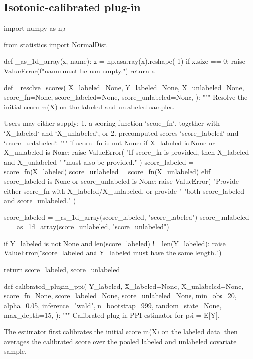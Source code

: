 \documentclass{article}
\theoremstyle{plain}
\theoremstyle{definition}
\newcommand{\1}{\mathbbm{1}}
\begin{document}
\subsection{Isotonic-calibrated plug-in}
\begin{codeblock}
import numpy as np

from statistics import NormalDist


def _as_1d_array(x, name):
    x = np.asarray(x).reshape(-1)
    if x.size == 0:
        raise ValueError(f"{name} must be non-empty.")
    return x


def _resolve_scores(
    X_labeled=None,
    Y_labeled=None,
    X_unlabeled=None,
    score_fn=None,
    score_labeled=None,
    score_unlabeled=None,
):
    """
    Resolve the initial score m(X) on the labeled and unlabeled samples.

    Users may either supply:
    1. a scoring function `score_fn`, together with `X_labeled` and
       `X_unlabeled`, or
    2. precomputed scores `score_labeled` and `score_unlabeled`.
    """
    if score_fn is not None:
        if X_labeled is None or X_unlabeled is None:
            raise ValueError(
                "If score_fn is provided, then X_labeled and X_unlabeled "
                "must also be provided."
            )
        score_labeled = score_fn(X_labeled)
        score_unlabeled = score_fn(X_unlabeled)
    elif score_labeled is None or score_unlabeled is None:
        raise ValueError(
            "Provide either score_fn with X_labeled/X_unlabeled, or provide "
            "both score_labeled and score_unlabeled."
        )

    score_labeled = _as_1d_array(score_labeled, "score_labeled")
    score_unlabeled = _as_1d_array(score_unlabeled, "score_unlabeled")

    if Y_labeled is not None and len(score_labeled) != len(Y_labeled):
        raise ValueError("score_labeled and Y_labeled must have the same length.")

    return score_labeled, score_unlabeled


def calibrated_plugin_ppi(
    Y_labeled,
    X_labeled=None,
    X_unlabeled=None,
    score_fn=None,
    score_labeled=None,
    score_unlabeled=None,
    min_obs=20,
    alpha=0.05,
    inference="wald",
    n_bootstrap=999,
    random_state=None,
    max_depth=15,
):
    """
    Calibrated plug-in PPI estimator for psi = E[Y].

    The estimator first calibrates the initial score m(X) on the labeled data,
    then averages the calibrated score over the pooled labeled and unlabeled
    covariate sample.


\end{codeblock}
\end{document}

